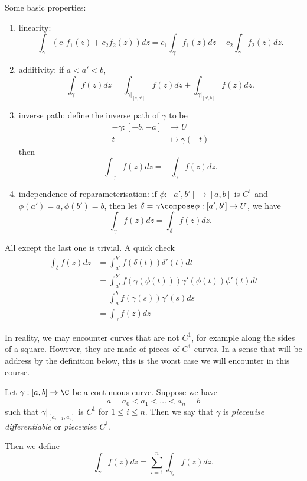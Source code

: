 \documentclass[a4paper]{article}
\begin{document}
Some basic properties:
\begin{enumerate}
\item linearity:
  \[
    \int_\gamma (c_1f_1(z) + c_2f_2(z))dz = c_1 \int_\gamma f_1(z) dz + c_2 \int_\gamma f_2(z) dz.
  \]
\item additivity: if \(a < a' < b\),
  \[
    \int_\gamma f(z)dz = \int_{\gamma|_{[a, a']}} f(z) dz + \int_{\gamma|_{[a', b]}} f(z)dz.
  \]
\item inverse path: define the inverse path of \(\gamma\) to be
  \begin{align*}
    -\gamma: [-b, -a] &\to U \\
    t &\mapsto \gamma(-t)
  \end{align*}
  then
  \[
    \int_{-\gamma} f(z)dz = -\int_\gamma f(z)dz.
  \]
\item independence of reparameterisation: if \(\phi: [a', b'] \to [a, b]\) is \(C^1\) and \(\phi(a') = a, \phi(b') = b\), then let \(\delta = \gamma \compose \phi: [a', b'] \to U\), we have
  \[
    \int_\gamma f(z) dz = \int_\delta f(z)dz.
  \]
\end{enumerate}
All except the last one is trivial. A quick check
\begin{align*}
  \int_\delta f(z)dz &= \int_{a'}^{b'} f(\delta(t))\delta'(t) dt \\
                     &= \int_{a'}^{b'} f(\gamma(\phi(t))) \gamma'(\phi(t)) \phi'(t) dt \\
                     &= \int_a^b f(\gamma(s))\gamma'(s) ds \\
                     &= \int_{\gamma}^{ } f(z) dz
\end{align*}

In reality, we may encounter curves that are not \(C^1\), for example along the sides of a square. However, they are made of pieces of \(C^1\) curves. In a sense that will be address by the definition below, this is the worst case we will encounter in this course.

\begin{definition}[Piecewise \(C^1\)]
 Let \(\gamma: [a, b] \to \C\) be a continuous curve. Suppose we have
\[
  a = a_0 < a_1 < \dots < a_n = b
\]
such that \(\gamma|_{[a_{i - 1}, a_i]}\) is \(C^1\) for \(1 \leq i \leq n\). Then we say that \(\gamma\) is \emph{piecewise differentiable} or \emph{piecewise \(C^1\)}.
\end{definition}

Then we define
\[
  \int_\gamma f(z) dz = \sum_{i = 1}^n \int_{\gamma_i} f(z)dz.
\]
\end{document}
